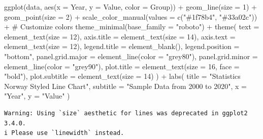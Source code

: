 \documentclass[
  10pt,
]{scrartcl}
\newenvironment{Shaded}{\begin{snugshade}}{\end{snugshade}}
\newcommand{\AttributeTok}[1]{\textcolor[rgb]{0.40,0.45,0.13}{#1}}
\newcommand{\CommentTok}[1]{\textcolor[rgb]{0.37,0.37,0.37}{#1}}
\newcommand{\DecValTok}[1]{\textcolor[rgb]{0.68,0.00,0.00}{#1}}
\newcommand{\FunctionTok}[1]{\textcolor[rgb]{0.28,0.35,0.67}{#1}}
\newcommand{\NormalTok}[1]{\textcolor[rgb]{0.00,0.23,0.31}{#1}}
\newcommand{\SpecialCharTok}[1]{\textcolor[rgb]{0.37,0.37,0.37}{#1}}
\newcommand{\StringTok}[1]{\textcolor[rgb]{0.13,0.47,0.30}{#1}}
\begin{document}
\begin{Shaded}
\begin{Highlighting}[]
\FunctionTok{ggplot}\NormalTok{(data, }\FunctionTok{aes}\NormalTok{(}\AttributeTok{x =}\NormalTok{ Year, }\AttributeTok{y =}\NormalTok{ Value, }\AttributeTok{color =}\NormalTok{ Group)) }\SpecialCharTok{+}
  \FunctionTok{geom\_line}\NormalTok{(}\AttributeTok{size =} \DecValTok{1}\NormalTok{) }\SpecialCharTok{+}
  \FunctionTok{geom\_point}\NormalTok{(}\AttributeTok{size =} \DecValTok{2}\NormalTok{) }\SpecialCharTok{+}
  \FunctionTok{scale\_color\_manual}\NormalTok{(}\AttributeTok{values =} \FunctionTok{c}\NormalTok{(}\StringTok{"\#1f78b4"}\NormalTok{, }\StringTok{"\#33a02c"}\NormalTok{)) }\SpecialCharTok{+} \CommentTok{\# Customize colors}
  \FunctionTok{theme\_minimal}\NormalTok{(}\AttributeTok{base\_family =} \StringTok{"roboto"}\NormalTok{) }\SpecialCharTok{+}
  \FunctionTok{theme}\NormalTok{(}
    \AttributeTok{text =} \FunctionTok{element\_text}\NormalTok{(}\AttributeTok{size =} \DecValTok{12}\NormalTok{),}
    \AttributeTok{axis.title =} \FunctionTok{element\_text}\NormalTok{(}\AttributeTok{size =} \DecValTok{14}\NormalTok{),}
    \AttributeTok{axis.text =} \FunctionTok{element\_text}\NormalTok{(}\AttributeTok{size =} \DecValTok{12}\NormalTok{),}
    \AttributeTok{legend.title =} \FunctionTok{element\_blank}\NormalTok{(),}
    \AttributeTok{legend.position =} \StringTok{"bottom"}\NormalTok{,}
    \AttributeTok{panel.grid.major =} \FunctionTok{element\_line}\NormalTok{(}\AttributeTok{color =} \StringTok{"grey80"}\NormalTok{),}
    \AttributeTok{panel.grid.minor =} \FunctionTok{element\_line}\NormalTok{(}\AttributeTok{color =} \StringTok{"grey90"}\NormalTok{),}
    \AttributeTok{plot.title =} \FunctionTok{element\_text}\NormalTok{(}\AttributeTok{size =} \DecValTok{16}\NormalTok{, }\AttributeTok{face =} \StringTok{"bold"}\NormalTok{),}
    \AttributeTok{plot.subtitle =} \FunctionTok{element\_text}\NormalTok{(}\AttributeTok{size =} \DecValTok{14}\NormalTok{)}
\NormalTok{  ) }\SpecialCharTok{+}
  \FunctionTok{labs}\NormalTok{(}
    \AttributeTok{title =} \StringTok{"Statistics Norway Styled Line Chart"}\NormalTok{,}
    \AttributeTok{subtitle =} \StringTok{"Sample Data from 2000 to 2020"}\NormalTok{,}
    \AttributeTok{x =} \StringTok{"Year"}\NormalTok{,}
    \AttributeTok{y =} \StringTok{"Value"}
\NormalTok{  )}
\end{Highlighting}
\end{Shaded}

\begin{verbatim}
Warning: Using `size` aesthetic for lines was deprecated in ggplot2 3.4.0.
i Please use `linewidth` instead.
\end{verbatim}
\end{document}
